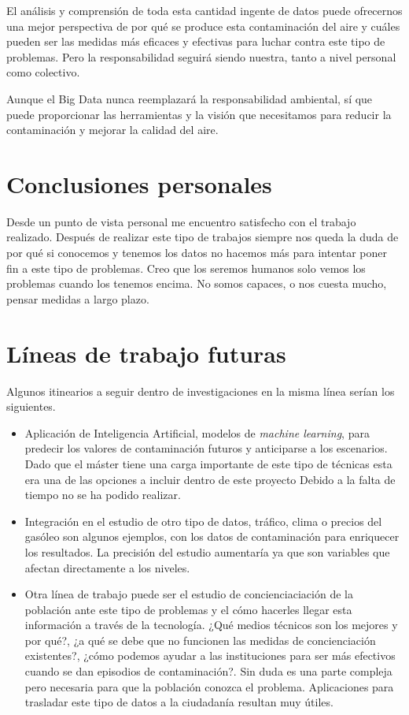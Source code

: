 El análisis y comprensión de toda esta cantidad ingente de datos puede ofrecernos una mejor perspectiva de por qué se produce esta contaminación del aire y cuáles pueden ser las medidas más eficaces y efectivas para luchar contra este tipo de problemas. Pero la responsabilidad seguirá siendo nuestra, tanto a nivel personal como colectivo.

Aunque el Big Data nunca reemplazará la responsabilidad ambiental, sí que puede proporcionar las herramientas y la visión que necesitamos para reducir la contaminación y mejorar la calidad del aire.


\section{Conclusiones personales}\label{conclusiones_personales}
Desde un punto de vista personal me encuentro satisfecho con el trabajo realizado. Después de realizar este tipo de trabajos siempre nos queda la duda de por qué si conocemos y tenemos los datos no hacemos más para intentar poner fin a este tipo de problemas. Creo que los seremos humanos solo vemos los problemas cuando los tenemos encima. No somos capaces, o nos cuesta mucho,  pensar medidas a largo plazo.

\section{Líneas de trabajo futuras}\label{lineas_futuras}

Algunos itinearios a seguir dentro de investigaciones en la misma línea serían los siguientes. 

\begin{itemize}
	\item Aplicación de Inteligencia Artificial, modelos de \textit{machine learning}, para predecir los valores de contaminación futuros y anticiparse a los escenarios. Dado que el máster tiene una carga importante de este tipo de técnicas esta era una de las opciones  a incluir dentro de este proyecto Debido a la falta de tiempo no se ha podido realizar.
	\item Integración en el estudio de otro tipo de datos, tráfico, clima o precios del gasóleo son algunos ejemplos, con los datos de contaminación para enriquecer los resultados. La precisión del estudio aumentaría ya que son variables que afectan directamente a los niveles. 
	\item Otra línea de trabajo puede ser el estudio de concienciaciación de la población ante este tipo de problemas y el cómo hacerles llegar esta información a través de la tecnología. ¿Qué medios técnicos son los mejores y por qué?, ¿a qué se debe que no funcionen las medidas de concienciación existentes?, ¿cómo podemos ayudar a las instituciones para ser más efectivos cuando se dan episodios de contaminación?. Sin duda es una parte compleja pero necesaria para que la población conozca el problema. Aplicaciones para trasladar este tipo de datos a la ciudadanía resultan muy útiles.
\end{itemize}



